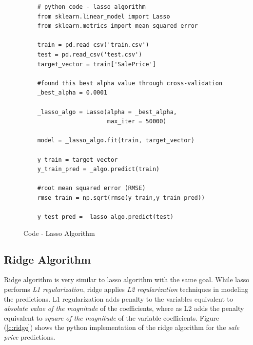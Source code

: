 \documentclass[sigconf]{acmart}
\begin{document}
	\begin{figure}[htb]
	\begin{verbatim}	
	# python code - lasso algorithm
	from sklearn.linear_model import Lasso
	from sklearn.metrics import mean_squared_error
	
	train = pd.read_csv('train.csv')
	test = pd.read_csv('test.csv')
	target_vector = train['SalePrice']
	
	#found this best alpha value through cross-validation
	_best_alpha = 0.0001	
	
	_lasso_algo = Lasso(alpha = _best_alpha, 
	                    max_iter = 50000)
	
	model = _lasso_algo.fit(train, target_vector)  
		
	y_train = target_vector
	y_train_pred = _algo.predict(train)
	
	#root mean squared error (RMSE)
	rmse_train = np.sqrt(rmse(y_train,y_train_pred))
		
	y_test_pred = _lasso_algo.predict(test)	
	\end{verbatim}
	\caption{Code - Lasso Algorithm} \label{c:lasso} 
	\end{figure}
	
	\subsection{Ridge Algorithm}
	
	Ridge algorithm is very similar to lasso algorithm with the same goal. While lasso performs {\em L1 regularization}, ridge applies {\em L2 regularization} techniques in modeling the predictions. L1 regularization adds penalty to the variables equivalent to {\em absolute value of the magnitude} of the coefficients, where as L2 adds the penalty equivalent to {\em square of the magnitude} of the variable coefficients. Figure (\ref{c:ridge}) shows the python implementation of the ridge algorithm for the {\em sale price} predictions. 
		
\end{document}
